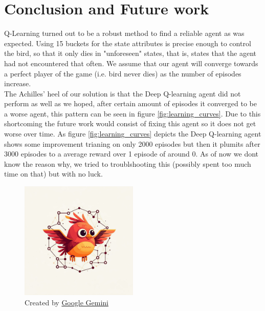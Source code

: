 \documentclass[a4paper,12pt]{article}
\begin{document}

\section{Conclusion and Future work}
Q-Learning turned out to be a robust method to find a reliable agent as was expected. Using 15 buckets for the state attributes is precise enough to
control the bird, so that it only dies in "unforeseen" states, that is, states that the agent had not encountered that often. We assume that our agent
will converge towards a perfect player of the game (i.e. bird never dies) as the number of episodes increase.
\\
The Achilles' heel of our solution is that the Deep Q-learning agent did not perform as well as we hoped, 
after certain amount of episodes it converged to be a worse agent, this pattern can be seen in figure \ref{fig:learning_curves}.
Due to this shortcoming the future work would consist of fixing this agent so it does not get worse over time. 
As figure \ref{fig:learning_curves} depicts the Deep Q-learning agent shows some improvement trianing on only 2000 episodes but then it plumits after 3000 episodes to a average reward over 1 episode of around 0. 
As of now we dont know the reason why, we tried to troublshooting this (possibly spent too much time on that) but with no luck. 


\begin{figure}[H]
    \centering
    \includegraphics[width=0.5\textwidth]{ai_image.jpg}
    \caption{Created by \href{https://gemini.google.com/}{Google Gemini}}
    \label{fig:gemini}
\end{figure}
\end{document}
